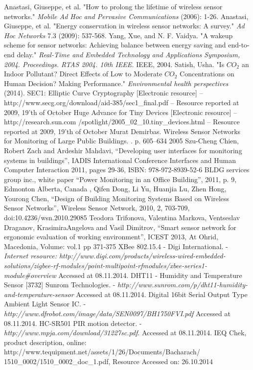 \documentclass[journal]{IEEEtran}
\begin{document}
\begin{thebibliography}{999}
  Anastasi, Giuseppe, et al.  "How to prolong the lifetime of wireless sensor networks." {\it Mobile Ad Hoc and Pervasive Communications} (2006): 1-26.
 Anastasi, Giuseppe, et al. "Energy conservation in wireless sensor networks: A survey." {\it Ad Hoc Networks} 7.3 (2009): 537-568.
 Yang, Xue, and N. F. Vaidya. "A wakeup scheme for sensor networks: Achieving balance between energy saving and end-to-end delay." {\it Real-Time and Embedded Technology and Applications Symposium, 2004. Proceedings. RTAS 2004. 10th IEEE.} IEEE, 2004.
 Satish, Usha. "Is $CO_2$ an Indoor Pollutant? Direct Effects of Low to Moderate $CO_2$ Concentrations on Human Decision? Making Performance." {\it Environmental health perspectives} (2014).
 SEC1: Elliptic Curve Cryptography [Electronic resource] – http://www.secg.org/download/aid-385/sec1\_final.pdf – Resource reported at 2009, 19’th of October
 Huge Advance for Tiny Devices [Electronic resource] – http://research.sun.com /spotlight/2005\_02\_10.tiny\_devices.html – Resource reported at 2009, 19’th of October
 Murat Demirbas. Wireless Sensor Networks for Monitoring of Large Public Buildings. . p. 605--634 2005
Szu-Cheng Chien, Robert Zach and Ardeshir Mahdavi, “Developing user interfaces for monitoring systems in buildings”, IADIS International Conference Interfaces and Human Computer Interaction 2011, pages 29-36, ISBN: 978-972-8939-52-6
BLDG services group inc., white paper “Power Monitoring in an Office Building”, 2011, p. 9, Edmonton Alberta, Canada
, Qifen Dong, Li Yu, Huanjia Lu, Zhen Hong, Yourong Chen, “Design of Building Monitoring Systems Based on Wireless Sensor Networks”, Wireless Sensor Network, 2010, 2, 703-709, doi:10.4236/wsn.2010.29085
 Teodora Trifonova, Valentina Markova, Ventseslav Draganov, KrasimiraAngelova and Vasil Dimitrov, “Smart sensor network for ergonomic evaluation of working environment”,  ICEST 2013, At Ohrid, Macedonia, Volume: vol.1 pp 371-375
 XBee 802.15.4 - Digi International. - {\it Internet resource: http://www.digi.com/products/wireless-wired-embedded-solutions/zigbee-rf-modules/point-multipoint-rfmodules/xbee-series1-module\#overview} Accessed at 08.11.2014.
 DHT11 - Humidity and Temperature Sensor [3732] Sunrom Technologies. - {\it http://www.sunrom.com/p/dht11-humidity-and-temperature-sensor} Accessed at 08.11.2014.
 Digital 16bit Serial Output Type Ambient Light Sensor IC. - {\it http://www.dfrobot.com/image/data/SEN0097/BH1750FVI.pdf} Accessed at 08.11.2014.
 HC-SR501 PIR motion detector. - {\it http://www.mpja.com/download/31227sc.pdf}. Accessed at 08.11.2014.
 IEQ Chek, product description, online: http://www.tequipment.net/assets/1/26/Documents/Bacharach/ 1510\_0002/1510\_0002\_doc\_1.pdf, Resource Accessed on: 26.10.2014
\end{thebibliography}
\end{document}
